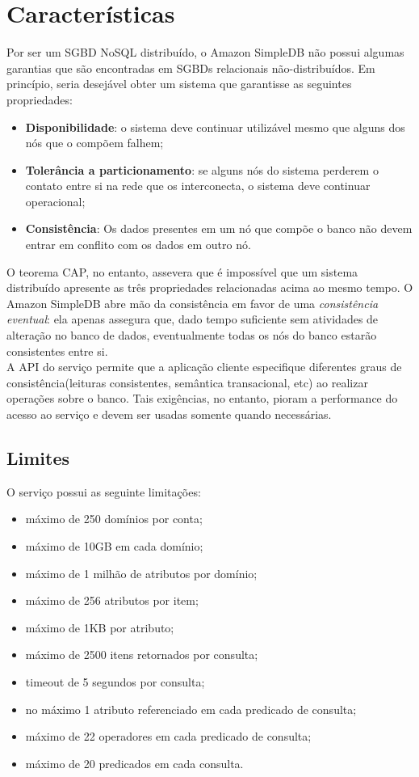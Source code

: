 \section{Características}
	Por ser um SGBD NoSQL distribuído, o Amazon SimpleDB não possui algumas garantias que são encontradas em SGBDs relacionais não-distribuídos. Em princípio, seria desejável obter um sistema que garantisse as seguintes propriedades:
\begin{itemize}
	\item
	\textbf{Disponibilidade}: o sistema deve continuar utilizável mesmo que alguns dos nós que o compõem falhem;
	
	\item
	\textbf{Tolerância a particionamento}: se alguns nós do sistema perderem o contato entre si na rede que os interconecta, o sistema deve continuar operacional;
	
	\item
	\textbf{Consistência}: Os dados presentes em um nó que compõe o banco não devem entrar em conflito com os dados em outro nó.
\end{itemize}

	O teorema CAP, no entanto, assevera que é impossível que um sistema distribuído apresente as três propriedades relacionadas acima ao mesmo tempo\cite{WikiCapTheo}. O Amazon SimpleDB abre mão da consistência em favor de uma \textit{consistência eventual}: ela apenas assegura que, dado tempo suficiente sem atividades de alteração no banco de dados, eventualmente todas os nós do banco estarão consistentes entre si\cite{WikiEvCons}.\\
	A API do serviço permite que a aplicação cliente especifique diferentes graus de consistência(leituras consistentes, semântica transacional, etc) ao realizar operações sobre o banco. Tais exigências, no entanto, pioram a performance do acesso ao serviço e devem ser usadas somente quando necessárias.
	
\subsection{Limites}
O serviço possui as seguinte limitações\cite{WikiSimpleDb}:
\begin{itemize}
	\item máximo de 250 domínios por conta;
	\item máximo de 10GB em cada domínio;
	\item máximo de 1 milhão de atributos por domínio;
	\item máximo de 256 atributos por item;
	\item máximo de 1KB por atributo;
	\item máximo de 2500 itens retornados por consulta;
	\item timeout de 5 segundos por consulta;
	\item no máximo 1 atributo referenciado em cada predicado de consulta;
	\item máximo de 22 operadores em cada predicado de consulta;
	\item máximo de 20 predicados em cada consulta.
\end{itemize}

